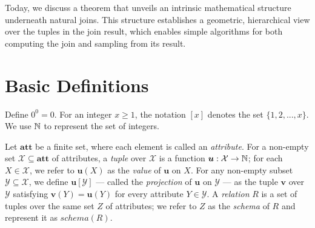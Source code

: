 



\usepackage{wasysym}

\title{}
\author{}
\date{}


\def\C{\mathcal{C}}
\def\E{\mathcal{E}}
\def\FF{\EuScript{F}}
\def\G{\mathcal{G}}
\def\GG{\EuScript{G}}
\def\H{\mathcal{H}}
\def\I{\mathcal{I}}
\def\J{\mathcal{J}}
\def\L{\mathcal{L}}
\def\Q{\mathcal{Q}}
\def\S{\mathcal{S}}
\def\T{\mathcal{T}}
\def\V{\mathcal{V}}
\def\W{\mathscr{W}}
\def\X{\mathcal{X}}
\def\Y{\mathcal{Y}}
\def\Z{\mathcal{Z}}
\def\att{\mit{diffatt}}
\def\agm{\mathit{AGM}}
\def\boldatt{\mathbf{att}}
\def\ext{\mathit{ext}}
\def\In{\mathrm{IN}}
\def\join{\mathit{join}}
\def\Out{\mathrm{OUT}}
\def\schema{\mathit{schema}}

\def\extraspacing{\vspace{4mm} \noindent}
\def\vgap{\vspace{4mm}}
\def\vslit{\vspace{2mm}}




Today, we discuss a theorem that unveils an intrinsic mathematical structure underneath natural joins. This structure establishes a geometric, hierarchical view over the tuples in the join result, which enables simple algorithms for both computing the join and sampling from its result.


\section{Basic Definitions}

Define $0^0 = 0$. For an integer $x \ge 1$, the notation $[x]$ denotes the set $\{1, 2, ..., x\}$. We use $\mathbb{N}$ to represent the set of integers.

\vgap

Let $\boldatt$ be a finite set, where each element is called an {\em attribute}. For a non-empty set $\X \subseteq \boldatt$ of attributes, a {\em tuple} over $\X$ is a function $\bm{u}: \X \rightarrow \intdom$; for each $X \in \X$, we refer to $\bm{u}(X)$ as the {\em value} of $\bm{u}$ on $X$. For any non-empty subset $\Y \subseteq \X$, we define $\bm{u}[\Y]$ --- called the {\em projection} of $\bm{u}$ on $\Y$ --- as the tuple $\bm{v}$ over $\Y$ satisfying $\bm{v}(Y) = \bm{u}(Y)$ for every attribute $Y \in \Y$. A {\em relation} $R$ is a set of tuples over the same set $Z$ of attributes; we refer to $Z$ as the {\em schema} of $R$ and represent it as $\schema(R)$.

